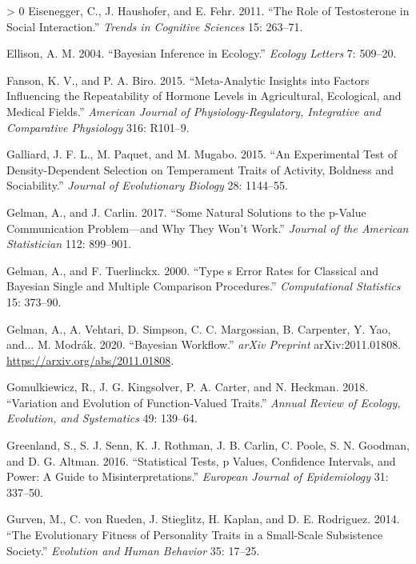 \documentclass{article}
\newlength{\cslhangindent}
\newenvironment{CSLReferences}[3] %
 {%
  \setlength{\parindent}{0pt}
  \ifodd #1 \everypar{\setlength{\hangindent}{\cslhangindent}}\ignorespaces\fi
  \ifnum #2 > 0
  \setlength{\parskip}{#2\baselineskip}
  \fi
 }%
 {}
\begin{document}
\begin{CSLReferences}{1}{0}
\leavevmode\hypertarget{ref-Eis2011}{}%
Eisenegger, C., J. Haushofer, and E. Fehr. 2011. {``The Role of
Testosterone in Social Interaction.''} \emph{Trends in Cognitive
Sciences} 15: 263--71.

\leavevmode\hypertarget{ref-Ellison2004}{}%
Ellison, A. M. 2004. {``Bayesian Inference in Ecology.''} \emph{Ecology
Letters} 7: 509--20.

\leavevmode\hypertarget{ref-Fanson2019}{}%
Fanson, K. V., and P. A. Biro. 2015. {``Meta-Analytic Insights into
Factors Influencing the Repeatability of Hormone Levels in Agricultural,
Ecological, and Medical Fields.''} \emph{American Journal of
Physiology-Regulatory, Integrative and Comparative Physiology} 316:
R101--9.

\leavevmode\hypertarget{ref-Gall2015}{}%
Galliard, J. F. L., M. Paquet, and M. Mugabo. 2015. {``An Experimental
Test of Density-Dependent Selection on Temperament Traits of Activity,
Boldness and Sociability.''} \emph{Journal of Evolutionary Biology} 28:
1144--55.

\leavevmode\hypertarget{ref-Gelman2017}{}%
Gelman, A., and J. Carlin. 2017. {``Some Natural Solutions to the
p-Value Communication Problem---and Why They Won't Work.''}
\emph{Journal of the American Statistician} 112: 899--901.

\leavevmode\hypertarget{ref-Gelman2000}{}%
Gelman, A., and F. Tuerlinckx. 2000. {``Type s Error Rates for Classical
and Bayesian Single and Multiple Comparison Procedures.''}
\emph{Computational Statistics} 15: 373--90.

\leavevmode\hypertarget{ref-Gelman2020}{}%
Gelman, A., A. Vehtari, D. Simpson, C. C. Margossian, B. Carpenter, Y.
Yao, and... M. Modrák. 2020. {``Bayesian Workflow.''} \emph{arXiv
Preprint} arXiv:2011.01808. \url{https://arxiv.org/abs/2011.01808}.

\leavevmode\hypertarget{ref-Gomulk2018}{}%
Gomulkiewicz, R., J. G. Kingsolver, P. A. Carter, and N. Heckman. 2018.
{``Variation and Evolution of Function-Valued Traits.''} \emph{Annual
Review of Ecology, Evolution, and Systematics} 49: 139--64.

\leavevmode\hypertarget{ref-Green2016}{}%
Greenland, S., S. J. Senn, K. J. Rothman, J. B. Carlin, C. Poole, S. N.
Goodman, and D. G. Altman. 2016. {``Statistical Tests, p Values,
Confidence Intervals, and Power: A Guide to Misinterpretations.''}
\emph{European Journal of Epidemiology} 31: 337--50.

\leavevmode\hypertarget{ref-Gurven2014}{}%
Gurven, M., C. von Rueden, J. Stieglitz, H. Kaplan, and D. E. Rodriguez.
2014. {``The Evolutionary Fitness of Personality Traits in a Small-Scale
Subsistence Society.''} \emph{Evolution and Human Behavior} 35: 17--25.


\end{CSLReferences}
\end{document}
